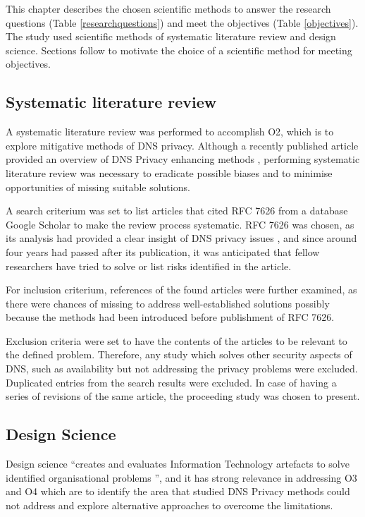 
This chapter describes the chosen scientific methods to answer the research questions (Table \ref{researchquestions}) and meet the objectives (Table \ref{objectives}).
The study used scientific methods of systematic literature review and design science.
Sections follow to motivate the choice of a scientific method for meeting objectives.
\subsection{Systematic literature review}
A systematic literature review was performed to accomplish O2, which is to explore mitigative methods of DNS privacy. Although a recently published article provided an overview of DNS Privacy enhancing methods \cite{van2018privacy}, performing systematic literature review was necessary to eradicate possible biases and to minimise opportunities of missing suitable solutions.

A search criterium was set to list articles that cited RFC 7626 from a database Google Scholar to make the review process systematic. RFC 7626 was chosen, as its analysis had provided a clear insight of DNS privacy issues \cite{rfc7626}, and since around four years had passed after its publication, it was anticipated that fellow researchers have tried to solve or list risks identified in the article.

For inclusion criterium, references of the found articles were further examined, as there were chances of missing to address well-established solutions possibly because the methods had been introduced before publishment of RFC 7626.

Exclusion criteria were set to have the contents of the articles to be relevant to the defined problem.
Therefore, any study which solves other security aspects of DNS, such as availability but not addressing the privacy problems were excluded.
Duplicated entries from the search results were excluded.
In case of having a series of revisions of the same article, the proceeding study was chosen to present.

\subsection{Design Science}
Design science ``creates and evaluates Information Technology artefacts to solve identified organisational problems \cite{von2004design}'', and it has strong relevance in addressing O3 and O4 which are to identify the area that studied DNS Privacy methods could not address and explore alternative approaches to overcome the limitations.

